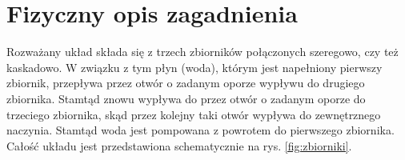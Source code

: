 \chapter{Fizyczny opis zagadnienia}
\label{cha:model}

\newtheorem{torricelli}{Prawo Torricellego}[chapter]
\newtheorem{mass}{Prawo zachowania masy}[chapter]
\newtheorem{pontriagin-max}{Zasada maksimum Pontriagina}[chapter]

Rozważany układ składa się z trzech zbiorników połączonych szeregowo, czy też kaskadowo.
W związku z tym płyn (woda), którym jest napełniony pierwszy zbiornik, przepływa przez otwór o zadanym oporze wypływu do drugiego zbiornika.
Stamtąd znowu wypływa do przez otwór o zadanym oporze do trzeciego zbiornika, skąd przez kolejny taki otwór wypływa do zewnętrznego naczynia.
Stamtąd woda jest pompowana z powrotem do pierwszego zbiornika.
Całość układu jest przedstawiona schematycznie na rys. \ref{fig:zbiorniki}.


